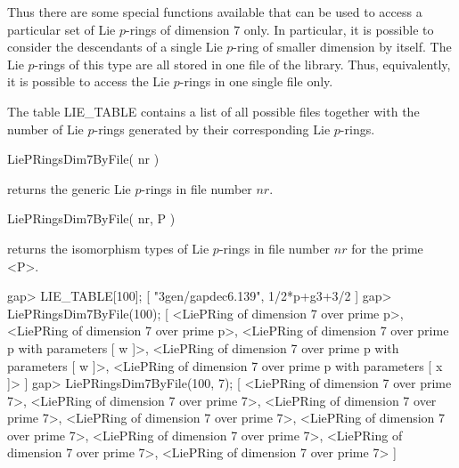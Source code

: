 Thus there are some special functions available that can be used to access
a particular set of Lie $p$-rings of dimension $7$ only. In particular, it
is possible to consider the descendants of a single Lie $p$-ring of smaller
dimension by itself. The Lie $p$-rings of this type are all stored in one
file of the library. Thus, equivalently, it is possible to access the Lie
$p$-rings in one single file only.

The table LIE_TABLE contains a list of all possible files together with
the number of Lie $p$-rings generated by their corresponding Lie $p$-rings. 

\> LiePRingsDim7ByFile( nr )

returns the generic Lie $p$-rings in file number $nr$.

\> LiePRingsDim7ByFile( nr, P )

returns the isomorphism types of Lie $p$-rings in file number $nr$ for
the prime <P>.

\beginexample
gap> LIE_TABLE[100];
[ "3gen/gapdec6.139", 1/2*p+g3+3/2 ]
gap> LiePRingsDim7ByFile(100);
[ <LiePRing of dimension 7 over prime p>, 
  <LiePRing of dimension 7 over prime p>, 
  <LiePRing of dimension 7 over prime p with parameters [ w ]>, 
  <LiePRing of dimension 7 over prime p with parameters [ w ]>, 
  <LiePRing of dimension 7 over prime p with parameters [ x ]> ]
gap> LiePRingsDim7ByFile(100, 7);
[ <LiePRing of dimension 7 over prime 7>, 
  <LiePRing of dimension 7 over prime 7>, 
  <LiePRing of dimension 7 over prime 7>, 
  <LiePRing of dimension 7 over prime 7>, 
  <LiePRing of dimension 7 over prime 7>, 
  <LiePRing of dimension 7 over prime 7>, 
  <LiePRing of dimension 7 over prime 7>, 
  <LiePRing of dimension 7 over prime 7> ]
\endexample

